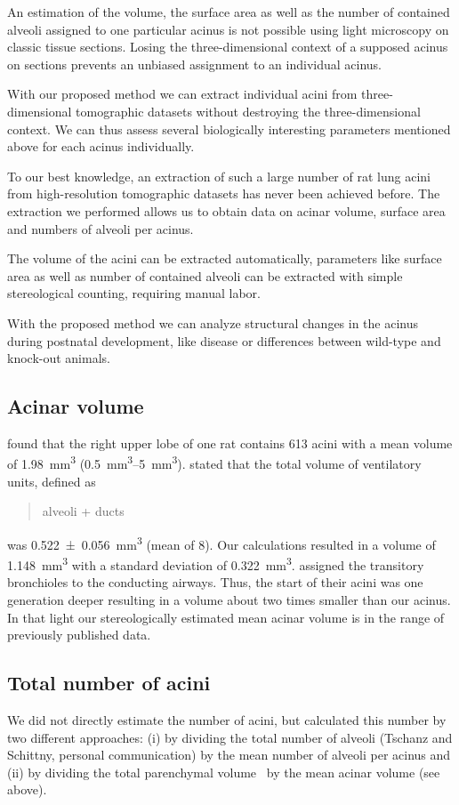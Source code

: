 \documentclass[paper=a4,DIV=calc,abstract,english]{scrartcl}
\newcommand{\meanacinarvolume}{1.148} %
\newcommand{\meanacinarvolumeSTD}{0.322} %
\begin{document}
An estimation of the volume, the surface area as well as the number of contained alveoli assigned to one particular acinus is not possible using light microscopy on classic tissue sections.
Losing the three-dimensional context of a supposed acinus on sections prevents an unbiased assignment to an individual acinus.

With our proposed method we can extract individual acini from three-dimensional tomographic datasets without destroying the three-dimensional context.
We can thus assess several biologically interesting parameters mentioned above for each acinus individually.

To our best knowledge, an extraction of such a large number of rat lung acini from high-resolution tomographic datasets has never been achieved before.
The extraction we performed allows us to obtain data on acinar volume, surface area and numbers of alveoli per acinus.

The volume of the acini can be extracted automatically, parameters like surface area as well as number of contained alveoli can be extracted with simple stereological counting, requiring manual labor.

With the proposed method we can analyze structural changes in the acinus during postnatal development, like disease or differences between wild-type and knock-out animals.

\subsection{Acinar volume}
\citet{Rodriguez1987} found that the right upper lobe of one rat contains 613 acini with a mean volume of \SI{1.98}{\milli\meter\cubed} (\SIrange{0.5}{5}{\milli\meter\cubed}).
\citet{Mercer1987a} stated that the total volume of ventilatory units, defined as \blockquote{alveoli + ducts} was \SI{0.522(56)}{\milli\meter\cubed} (mean of 8). %
Our calculations resulted in a volume of \SI{\meanacinarvolume}{\milli\meter\cubed} with a standard deviation of \SI{\meanacinarvolumeSTD}{\milli\meter\cubed}.
\citeauthor{Mercer1987a} assigned the transitory bronchioles to the conducting airways.
Thus, the start of their acini was one generation deeper resulting in a volume about two times smaller than our acinus.
In that light our stereologically estimated mean acinar volume is in the range of previously published data.

\subsection{Total number of acini}
We did not directly estimate the number of acini, but calculated this number by two different approaches: (i) by dividing the total number of alveoli (Tschanz and Schittny, personal communication) by the mean number of alveoli per acinus and (ii) by dividing the total parenchymal volume~\citep{Tschanz2003} by the mean acinar volume (see above).
\end{document}
